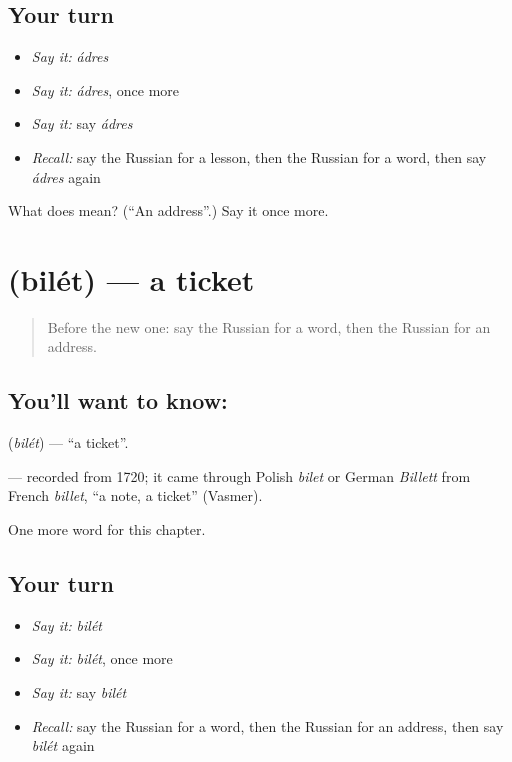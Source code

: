 \subsection*{Your turn}
\begin{itemize}
\raggedright
  \item \emph{Say it:} \emph{ádres}
  \item \emph{Say it:} \emph{ádres}, once more
  \item \emph{Say it:} say \emph{ádres}
  \item \emph{Recall:} say the Russian for a lesson, then the Russian for a word, then say \emph{ádres} again
\end{itemize}

\begin{tcolorbox}[breakable,colback=teal!4,colframe=teal!35!black,title={Before you move on}]
What does  mean? (\textquotedblleft{}An address\textquotedblright{}.) Say it once more.
\end{tcolorbox}
\section[\texorpdfstring{\ru{билет} (bilét)}{билет (bilét)}]{ (bilét) — a ticket}

\label{lesson:RU-C54-ticket}



\begin{quote}
Before the new one: say the Russian for a word, then the Russian for an address.
\end{quote}

\subsection*{You'll want to know: }
\textbf{} (\emph{bilét}) — \textquotedblleft{}a ticket\textquotedblright{}.

\begin{cousinweb}
\textbf{} — recorded from 1720; it came through Polish \emph{bilet} or German \emph{Billett} from French \emph{billet}, \textquotedblleft{}a note, a ticket\textquotedblright{} (Vasmer).
\end{cousinweb}

\begin{grammarlens}[title={What you've built}]
One more word for this chapter.
\end{grammarlens}

\subsection*{Your turn}
\begin{itemize}
\raggedright
  \item \emph{Say it:} \emph{bilét}
  \item \emph{Say it:} \emph{bilét}, once more
  \item \emph{Say it:} say \emph{bilét}
  \item \emph{Recall:} say the Russian for a word, then the Russian for an address, then say \emph{bilét} again
\end{itemize}

